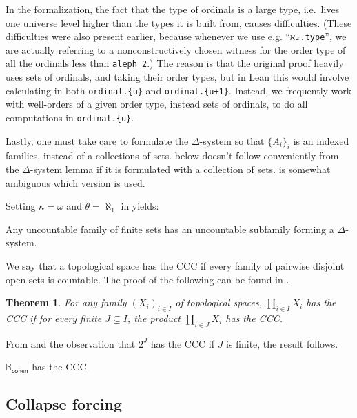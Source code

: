 \documentclass[sigplan,10pt,review, anonymous]{acmart}
\newcommand{\B}{\mathbb{B}}
\newcommand{\lil}{\lstinline}
\newtheorem{thm}{Theorem}[section]
\theoremstyle{definition}
\begin{document}
In the formalization, the fact that the type of ordinals is a large type, i.e.\ lives one universe level higher than the types it is built from, causes difficulties. (These difficulties were also present earlier, because whenever we use e.g. ``\lil{ℵ₂.type}'', we are actually referring to a nonconstructively chosen witness for the order type of all the ordinals less than \lil{aleph 2}.)
The reason is that the original proof heavily uses sets of ordinals, and taking their order types, but in Lean this would involve calculating in both \lstinline"ordinal.{u}" and \lstinline"ordinal.{u+1}".
Instead, we frequently work with well-orders of a given order type, instead sets of ordinals, to do all computations in \lstinline"ordinal.{u}".

Lastly, one must take care to formulate the $\Delta$-system so that $\{A_i\}_i$ is an indexed families, instead of a collections of sets.
 below doesn't follow conveniently from the $\Delta$-system lemma if it is formulated with a collection of sets.
\cite{kunen2014set} is somewhat ambiguous which version is used.

Setting \(\kappa = \omega\) and \(\theta = \aleph_1\) in  yields:
\begin{lemma}\label{lemma:delta-system-lemma:simple}
  Any uncountable family of finite sets has an uncountable subfamily forming a $\Delta$-system.
\end{lemma}
We say that a topological space has the CCC if every family of pairwise disjoint open sets is countable. The proof of the following can be found in \cite{DBLP:conf/itp/HanD19}.
\begin{thm}\label{thm:product-ccc}
  For any family $(X_i)_{i\in I}$ of topological spaces, $\prod_{i\in I} X_i$ has the CCC if for every finite $J\subseteq I$, the product $\prod_{i\in J} X_i$ has the CCC.
\end{thm}
From  and the observation that $2^J$ has the CCC if $J$ is finite, the result follows.
\begin{lemma}\label{lemma:cohen-algebra-CCC}
  \(\B_{\mathsf{cohen}}\) has the CCC.
\end{lemma}

\subsection{Collapse forcing} \label{subsect:collapse}
\end{document}
